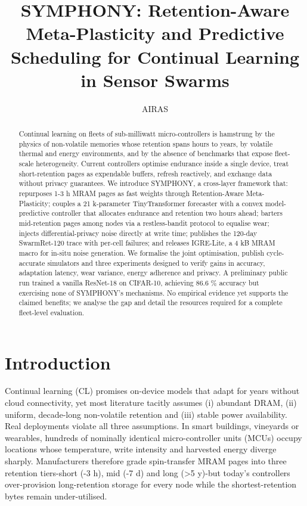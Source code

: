 \documentclass{article}
\title{SYMPHONY: Retention-Aware Meta-Plasticity and Predictive Scheduling for Continual Learning in Sensor Swarms}
\author{AIRAS}
\begin{document}
\maketitle

\begin{abstract}
Continual learning on fleets of sub-milliwatt micro-controllers is hamstrung by the physics of non-volatile memories whose retention spans hours to years, by volatile thermal and energy environments, and by the absence of benchmarks that expose fleet-scale heterogeneity. Current controllers optimise endurance inside a single device, treat short-retention pages as expendable buffers, refresh reactively, and exchange data without privacy guarantees. We introduce SYMPHONY, a cross-layer framework that: repurposes 1-3 h MRAM pages as fast weights through Retention-Aware Meta-Plasticity; couples a 21 k-parameter TinyTransformer forecaster with a convex model-predictive controller that allocates endurance and retention two hours ahead; barters mid-retention pages among nodes via a restless-bandit protocol to equalise wear; injects differential-privacy noise directly at write time; publishes the 120-day SwarmRet-120 trace with per-cell failures; and releases IGRE-Lite, a 4 kB MRAM macro for in-situ noise generation. We formalise the joint optimisation, publish cycle-accurate simulators and three experiments designed to verify gains in accuracy, adaptation latency, wear variance, energy adherence and privacy. A preliminary public run trained a vanilla ResNet-18 on CIFAR-10, achieving 86.6 \% accuracy but exercising none of SYMPHONY’s mechanisms. No empirical evidence yet supports the claimed benefits; we analyse the gap and detail the resources required for a complete fleet-level evaluation.
\end{abstract}

\section{Introduction}
Continual learning (CL) promises on-device models that adapt for years without cloud connectivity, yet most literature tacitly assumes (i) abundant DRAM, (ii) uniform, decade-long non-volatile retention and (iii) stable power availability. Real deployments violate all three assumptions. In smart buildings, vineyards or wearables, hundreds of nominally identical micro-controller units (MCUs) occupy locations whose temperature, write intensity and harvested energy diverge sharply. Manufacturers therefore grade spin-transfer MRAM pages into three retention tiers-short (-3 h), mid (-7 d) and long (>5 y)-but today’s controllers over-provision long-retention storage for every node while the shortest-retention bytes remain under-utilised.
\end{document}
